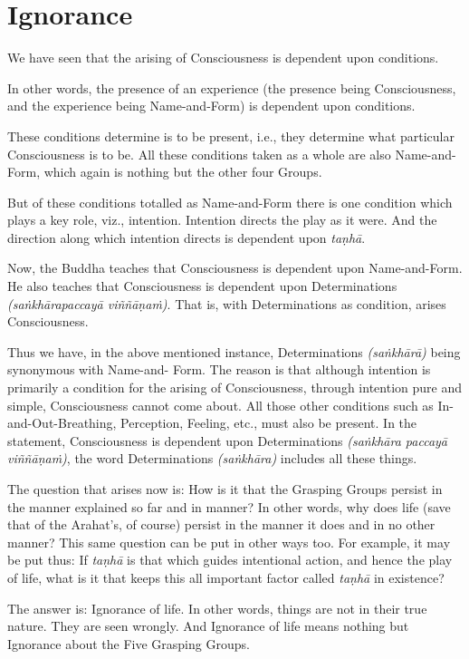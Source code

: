 \chapter{Ignorance}

We have seen that the arising of Consciousness is dependent upon conditions.

In other words, the presence of an experience (the presence being Consciousness, and the experience being Name-and-Form) is dependent upon conditions.

These conditions determine  is to be present, i.e., they determine what particular Consciousness is to be. All these conditions taken as a whole are also Name-and-Form, which again is nothing but the other four Groups.

But of these conditions totalled as Name-and-Form there is one condition which plays a key role, viz., intention. Intention directs the play as it were. And the direction along which intention directs is dependent upon \emph{taṇhā}.

Now, the Buddha teaches that Consciousness is dependent upon Name-and-Form. He also teaches that Consciousness is dependent upon Determinations \emph{(saṅkhārapaccayā viññāṇaṁ)}. That is, with Determinations as condition, arises Consciousness.

Thus we have, in the above mentioned instance, Determinations \emph{(saṅkhārā)} being synonymous with Name-and- Form. The reason is that although intention is primarily a condition for the arising of Consciousness, through intention  pure and simple, Consciousness cannot come about. All those other conditions such as In-and-Out-Breathing, Perception, Feeling, etc., must also be present. In the statement, Consciousness is dependent upon Determinations \emph{(saṅkhāra paccayā viññāṇaṁ)}, the word Determinations \emph{(saṅkhāra)} includes all these things.

The question that arises now is: How is it that the Grasping Groups persist in the manner explained so far and in  manner? In other words, why does life (save that of the Arahat's, of course) persist in the manner it does and in no other manner? This same question can be put in other ways too. For example, it may be put thus: If \emph{taṇhā} is that which guides intentional action, and hence the play of life, what is it that keeps this all important factor called \emph{taṇhā} in existence?

The answer is: Ignorance of life. In other words, things are not  in their true nature. They are seen wrongly. And Ignorance of life means nothing but Ignorance about the Five Grasping Groups.

